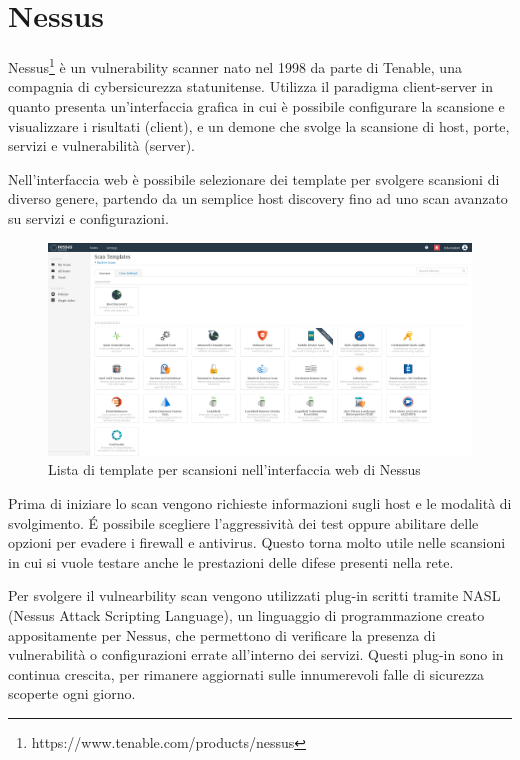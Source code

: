 \documentclass[12pt]{report}
\begin{document}
\section{Nessus}

Nessus\footnote{https://www.tenable.com/products/nessus} è un vulnerability scanner nato nel 1998 da parte di Tenable, una compagnia di cybersicurezza statunitense. Utilizza il paradigma client-server in quanto presenta un'interfaccia grafica in cui è possibile configurare la scansione e visualizzare i risultati (client), e un demone che svolge la scansione di host, porte, servizi e vulnerabilità (server).

Nell'interfaccia web è possibile selezionare dei template per svolgere scansioni di diverso genere, partendo da un semplice host discovery fino ad uno scan avanzato su servizi e configurazioni.
\begin{figure}[htbp]
	\centering
	\includegraphics[width = 36em]{immagini/nessus.png}
	\caption{Lista di template per scansioni nell'interfaccia web di Nessus}
	\label{fig:nessus}
\end{figure}

Prima di iniziare lo scan vengono richieste informazioni sugli host e le modalità di svolgimento. \'{E} possibile scegliere l'aggressività dei test oppure abilitare delle opzioni per evadere i firewall e antivirus. Questo torna molto utile nelle scansioni in cui si vuole testare anche le prestazioni delle difese presenti nella rete.

Per svolgere il vulnearbility scan vengono utilizzati plug-in scritti tramite NASL (Nessus Attack Scripting Language), un linguaggio di programmazione creato appositamente per Nessus, che permettono di verificare la presenza di vulnerabilità o configurazioni errate all'interno dei servizi. Questi plug-in sono in continua crescita, per rimanere aggiornati sulle innumerevoli falle di sicurezza scoperte ogni giorno.
\end{document}
